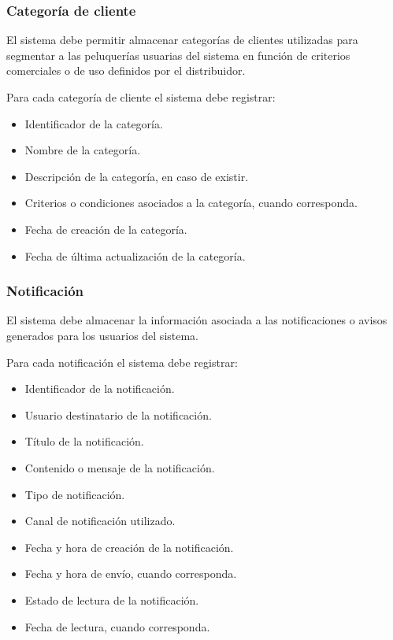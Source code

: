 \subsubsection*{Categoría de cliente}

El sistema debe permitir almacenar categorías de clientes utilizadas para segmentar a las peluquerías usuarias del sistema en función de criterios comerciales o de uso definidos por el distribuidor.

Para cada categoría de cliente el sistema debe registrar:

\begin{itemize}
    \item Identificador de la categoría.
    \item Nombre de la categoría.
    \item Descripción de la categoría, en caso de existir.
    \item Criterios o condiciones asociados a la categoría, cuando corresponda.
    \item Fecha de creación de la categoría.
    \item Fecha de última actualización de la categoría.
\end{itemize}

\subsubsection*{Notificación}

El sistema debe almacenar la información asociada a las notificaciones o avisos generados para los usuarios del sistema.

Para cada notificación el sistema debe registrar:

\begin{itemize}
    \item Identificador de la notificación.
    \item Usuario destinatario de la notificación.
    \item Título de la notificación.
    \item Contenido o mensaje de la notificación.
    \item Tipo de notificación.
    \item Canal de notificación utilizado.
    \item Fecha y hora de creación de la notificación.
    \item Fecha y hora de envío, cuando corresponda.
    \item Estado de lectura de la notificación.
    \item Fecha de lectura, cuando corresponda.
\end{itemize}

